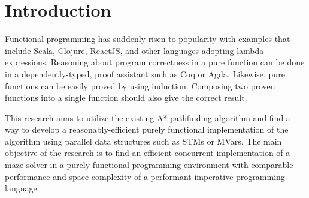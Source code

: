 \chapter{Introduction}

Functional programming has suddenly risen to popularity 
with examples that include Scala, Clojure, ReactJS, and 
other languages adopting lambda expressions. Reasoning 
about program correctness in a pure function can be done 
in a dependently-typed, proof assistant such as Coq or 
Agda\cite{Breitner2018}\cite{SpectorZabusky2018}\cite{ElBakouny2017}. 
Likewise, pure functions can be easily proved by using 
induction. Composing two proven functions into a single 
function should also give the correct result\cite{AbelBenkeBove2005}.

This research aims to utilize the existing A* pathfinding 
algorithm\cite{ZaghloulAlJami2017}\cite{WeinstockHolladay}
and find a way to develop a reasonably-efficient 
purely functional implementation of the algorithm using parallel 
data structures such as STMs or MVars\cite{Marlow2013}.  
The main objective of the research is 
to find an efficient concurrent implementation of a maze solver 
in a purely functional programming environment with comparable 
performance and space complexity of a performant imperative 
programming language.







